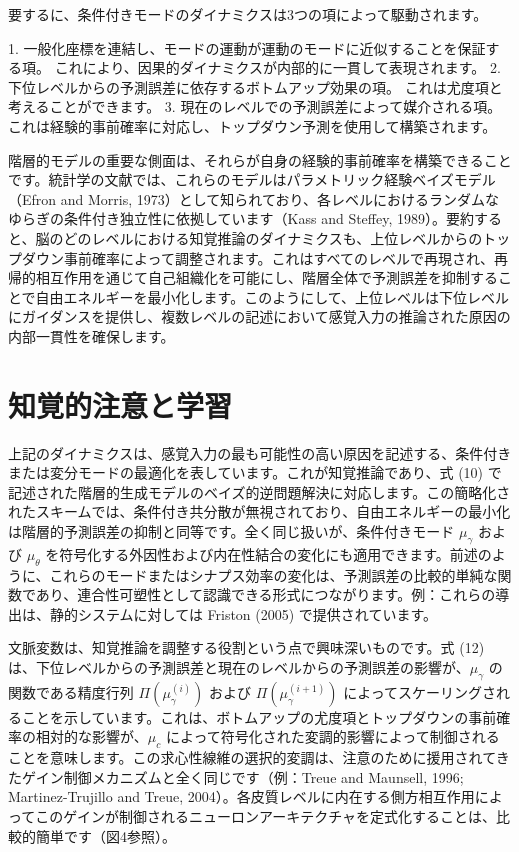 \documentclass{article}
\begin{document}
要するに、条件付きモードのダイナミクスは3つの項によって駆動されます。

1.  一般化座標を連結し、モードの運動が運動のモードに近似することを保証する項。 これにより、因果的ダイナミクスが内部的に一貫して表現されます。
2.  下位レベルからの予測誤差に依存するボトムアップ効果の項。 これは尤度項と考えることができます。
3.  現在のレベルでの予測誤差によって媒介される項。 これは経験的事前確率に対応し、トップダウン予測を使用して構築されます。

階層的モデルの重要な側面は、それらが自身の経験的事前確率を構築できることです。統計学の文献では、これらのモデルはパラメトリック経験ベイズモデル（Efron and Morris, 1973）として知られており、各レベルにおけるランダムなゆらぎの条件付き独立性に依拠しています（Kass and Steffey, 1989）。要約すると、脳のどのレベルにおける知覚推論のダイナミクスも、上位レベルからのトップダウン事前確率によって調整されます。これはすべてのレベルで再現され、再帰的相互作用を通じて自己組織化を可能にし、階層全体で予測誤差を抑制することで自由エネルギーを最小化します。このようにして、上位レベルは下位レベルにガイダンスを提供し、複数レベルの記述において感覚入力の推論された原因の内部一貫性を確保します。


\section{知覚的注意と学習}
上記のダイナミクスは、感覚入力の最も可能性の高い原因を記述する、条件付きまたは変分モードの最適化を表しています。これが知覚推論であり、式 (10) で記述された階層的生成モデルのベイズ的逆問題解決に対応します。この簡略化されたスキームでは、条件付き共分散が無視されており、自由エネルギーの最小化は階層的予測誤差の抑制と同等です。全く同じ扱いが、条件付きモード $\mu_\gamma$ および $\mu_\theta$ を符号化する外因性および内在性結合の変化にも適用できます。前述のように、これらのモードまたはシナプス効率の変化は、予測誤差の比較的単純な関数であり、連合性可塑性として認識できる形式につながります。例：これらの導出は、静的システムに対しては Friston (2005) で提供されています。

文脈変数は、知覚推論を調整する役割という点で興味深いものです。式 (12) は、下位レベルからの予測誤差と現在のレベルからの予測誤差の影響が、$\mu_\gamma$ の関数である精度行列 $\varPi(\mu^{(i)}_\gamma)$ および $\varPi(\mu^{(i+1)}_\gamma)$ によってスケーリングされることを示しています。これは、ボトムアップの尤度項とトップダウンの事前確率の相対的な影響が、$\mu_c$ によって符号化された変調的影響によって制御されることを意味します。この求心性線維の選択的変調は、注意のために援用されてきたゲイン制御メカニズムと全く同じです（例：Treue and Maunsell, 1996; Martinez-Trujillo and Treue, 2004）。各皮質レベルに内在する側方相互作用によってこのゲインが制御されるニューロンアーキテクチャを定式化することは、比較的簡単です（図4参照）。
\end{document}
